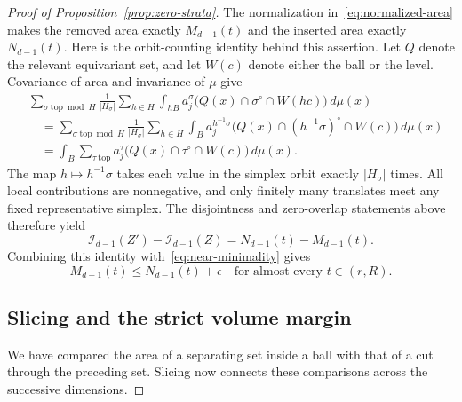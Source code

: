 \begin{proof}[Proof of Proposition~\ref{prop:zero-strata}]
The normalization in~\eqref{eq:normalized-area} makes the removed area
exactly $M_{d-1}(t)$ and the inserted area exactly $N_{d-1}(t)$.  Here is
the orbit-counting identity behind this assertion.  Let $Q$ denote the
relevant equivariant set, and let $W(c)$ denote either the ball or the
level.  Covariance of area and invariance of $\mu$ give
\begin{align*}
 &\sum_{\sigma\ \mathrm{top}\bmod H}\frac1{|H_\sigma|}
   \sum_{h\in H}\int_{hB}
   a_j^\sigma\bigl(Q(x)\cap\sigma^\circ\cap W(hc)\bigr)\,d\mu(x)
 \\
 &\quad=\sum_{\sigma\ \mathrm{top}\bmod H}\frac1{|H_\sigma|}
   \sum_{h\in H}\int_B
   a_j^{h^{-1}\sigma}
   \bigl(Q(x)\cap(h^{-1}\sigma)^\circ\cap W(c)\bigr)\,d\mu(x)
 \\
 &\quad=\int_B\sum_{\tau\ \mathrm{top}}
   a_j^\tau\bigl(Q(x)\cap\tau^\circ\cap W(c)\bigr)\,d\mu(x).
\end{align*}
The map $h\mapsto h^{-1}\sigma$ takes each value in the simplex orbit
exactly $|H_\sigma|$ times.  All local contributions are nonnegative,
and only finitely many translates meet any fixed representative simplex.
The disjointness and zero-overlap statements above therefore yield
\[
 \mathcal I_{d-1}(Z')-\mathcal I_{d-1}(Z)
 =N_{d-1}(t)-M_{d-1}(t).
\]
Combining this identity with~\eqref{eq:near-minimality} gives
\begin{equation}\label{eq:local-comparison}
 M_{d-1}(t)\le N_{d-1}(t)+\epsilon
 \quad\text{for almost every }t\in(r,R).
\end{equation}

\subsection{Slicing and the strict volume margin}

We have compared the area of a separating set inside a ball with that
of a cut through the preceding set.  Slicing now connects these
comparisons across the successive dimensions.


\end{proof}
